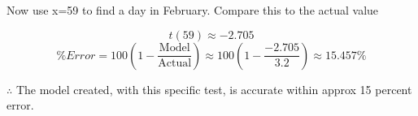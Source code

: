 \documentclass[12pt]{book}
\begin{document}
\begin{enumerate}
Now use x=59 to find a day in February. Compare this to the actual value

$$t(59) \approx -2.705$$
\vspace{0.1cm}
$$\% Error = 100\left(1-\dfrac{\text{Model}}{\text{Actual}}\right) \approx 100\left(1-\dfrac{-2.705}{3.2}\right) \approx \boxed{15.457\%}$$

\begin{center}
    $\therefore$ The model created, with this specific test, is accurate within approx 15 percent error.
\end{center}


\newpage


\end{enumerate}
\end{document}
